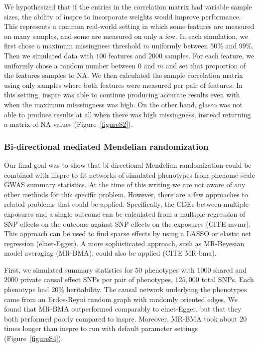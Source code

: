\documentclass{article}
\begin{document}
We hypothesized that if the entries in the correlation matrix had variable
sample sizes, the ability of inspre to incorporate weights would improve
performance. This represents a common real-world setting in
which some features are measured on many samples, and some are measured
on only a few. In each simulation, we first chose a maximum missingness
threshold $m$ uniformly between $50\%$ and $99\%$. Then we simulated data with
$100$ features and $2000$ samples. For each feature, we uniformly chose
a random number between $0$ and $m$ and set that proportion of the features
samples to NA. We then calculated the sample correlation matrix using only
samples where both features were measured per pair of features.
In this setting, inspre was able to continue producing accurate
results even with when the maximum misssingness was high. On the other
hand, glasso was not able to produce results at all when there was high
missingness, instead returning a matrix of NA values
(Figure~\ref{figureS2}).



\subsubsection*{Bi-directional mediated Mendelian randomization}
Our final goal was to show that bi-directional Mendelian randomization
could be combined with inspre to fit networks of simulated phenotypes
from phenome-scale GWAS summary statistics. At the time of this writing
we are not aware of any other methods for this specific problem. However,
there are a few approaches to related problems that could be applied.
Specifically, the CDEs between multiple exposures and a single outcome
can be calculated from a multiple regression of SNP effects on the outcome
against SNP effects on the exposures (CITE mvmr). This approach can be used
to find sparse effects by using a LASSO or elastic net regression (elnet-Egger). A more
sophisticated approach, such as MR-Beyesian model averaging (MR-BMA), could also be
applied (CITE MR-bma).

First, we simulated summary
statistics for $50$ phenotypes with $1000$ shared and $2000$ private
causal effect SNPs per pair of phenotypes, $125,000$ total SNPs. Each
phenotype had $20\%$ heritability. The causal
network underlying the phenotypes came from an Erdos-Reyni random graph with
randomly oriented edges. We found that MR-BMA outperformed comparably to
elnet-Egger, but that they both performed poorly compared to inspre.
Moreover, MR-BMA took about $20$ times longer than inspre to run with
default parameter settings (Figure~\ref{figureS4}).
\end{document}
